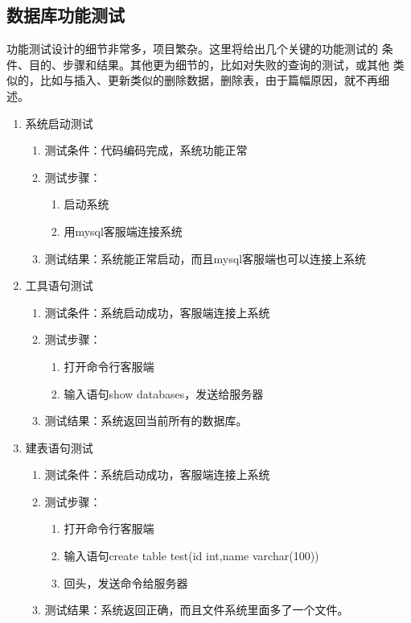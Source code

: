 \subsection{数据库功能测试}
功能测试设计的细节非常多，项目繁杂。这里将给出几个关键的功能测试的
条件、目的、步骤和结果。其他更为细节的，比如对失败的查询的测试，或其他
类似的，比如与插入、更新类似的删除数据，删除表，由于篇幅原因，就不再细
述。
\begin{enumerate}

	\item 系统启动测试
	\begin{enumerate}
		\item 测试条件：代码编码完成，系统功能正常
		\item 测试步骤：
		\begin{enumerate}
			\item 启动系统
			\item 用mysql客服端连接系统
		\end{enumerate}
	\item 	测试结果：系统能正常启动，而且mysql客服端也可以连接上系统
	\end{enumerate}



\item 工具语句测试
\begin{enumerate}
	\item 测试条件：系统启动成功，客服端连接上系统
	\item 测试步骤：
	\begin{enumerate}
		\item 打开命令行客服端
		\item 输入语句show databases，发送给服务器
	\end{enumerate}
	\item 	测试结果：系统返回当前所有的数据库。
\end{enumerate}	


\item 建表语句测试
\begin{enumerate}
	\item 测试条件：系统启动成功，客服端连接上系统
	\item 测试步骤：
	\begin{enumerate}
		\item 打开命令行客服端
		\item 输入语句create table test(id int,name	varchar(100))
		\item 回头，发送命令给服务器
	\end{enumerate}
	\item 	测试结果：系统返回正确，而且文件系统里面多了一个文件。
\end{enumerate}	



\end{enumerate}
